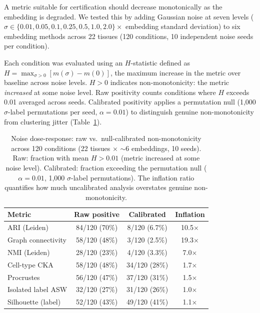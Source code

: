 \documentclass[11pt]{article}
\begin{document}
A metric suitable for certification should decrease monotonically as the
embedding is degraded. We tested this by adding Gaussian noise at seven
levels ($\sigma \in \{0.01, 0.05, 0.1, 0.25, 0.5, 1.0, 2.0\} \times$
embedding standard deviation) to six embedding methods across 22
tissues (120 conditions, 10 independent noise seeds per condition).

Each condition was evaluated using an $H$-statistic defined as
$H = \max_{\sigma > 0}[m(\sigma) - m(0)]$, the maximum increase in
the metric over baseline across noise levels. $H > 0$ indicates
non-monotonicity: the metric \emph{increased} at some noise level.
Raw positivity counts conditions where $H$ exceeds 0.01 averaged across
seeds. Calibrated positivity applies a permutation null (1{,}000
$\sigma$-label permutations per seed, $\alpha = 0.01$) to
distinguish genuine non-monotonicity from clustering jitter
(Table~\ref{tab:noise}).

\medskip
\begin{table}[h!]
\centering
\caption{Noise dose-response: raw vs.\ null-calibrated
non-monotonicity across 120 conditions (22 tissues $\times$ $\sim$6
embeddings, 10 seeds). Raw: fraction with mean $H > 0.01$ (metric
increased at some noise level). Calibrated: fraction exceeding the
permutation null ($\alpha = 0.01$, 1{,}000 $\sigma$-label
permutations). The inflation ratio quantifies how much uncalibrated
analysis overstates genuine non-monotonicity.}
\label{tab:noise}
\small
\begin{tabular}{@{}lccc@{}}
\toprule
Metric & Raw positive & Calibrated & Inflation \\
\midrule
ARI (Leiden)         & 84/120 (70\%) &  8/120 (6.7\%)  & 10.5$\times$ \\
Graph connectivity   & 58/120 (48\%) &  3/120 (2.5\%)  & 19.3$\times$ \\
NMI (Leiden)         & 28/120 (23\%) &  4/120 (3.3\%)  &  7.0$\times$ \\
\midrule
Cell-type CKA        & 58/120 (48\%) & 34/120 (28\%)   &  1.7$\times$ \\
Procrustes           & 56/120 (47\%) & 37/120 (31\%)   &  1.5$\times$ \\
\midrule
Isolated label ASW   & 32/120 (27\%) & 31/120 (26\%)   &  1.0$\times$ \\
Silhouette (label)   & 52/120 (43\%) & 49/120 (41\%)   &  1.1$\times$ \\
\bottomrule
\end{tabular}
\end{table}
\end{document}
